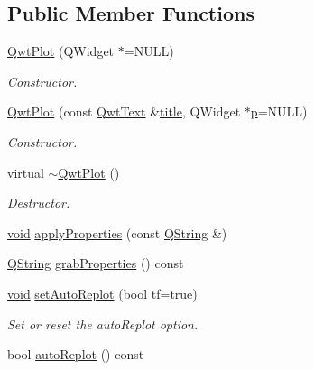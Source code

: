 \subsection*{Public Member Functions}
\begin{DoxyCompactItemize}
\item 
\hyperlink{class_qwt_plot_acde7121614da027e9a1dbc4591613ca7}{Qwt\-Plot} (Q\-Widget $\ast$=N\-U\-L\-L)
\begin{DoxyCompactList}\small\item\em Constructor. \end{DoxyCompactList}\item 
\hyperlink{class_qwt_plot_a12888a2101ba2091db0e4710c6a109cb}{Qwt\-Plot} (const \hyperlink{class_qwt_text}{Qwt\-Text} \&\hyperlink{class_qwt_plot_a1ae4b2e10f6691b7f1a14af70f743e2c}{title}, Q\-Widget $\ast$\hyperlink{glext_8h_aa5367c14d90f462230c2611b81b41d23}{p}=N\-U\-L\-L)
\begin{DoxyCompactList}\small\item\em Constructor. \end{DoxyCompactList}\item 
virtual \hyperlink{class_qwt_plot_a2b60620e3681810946dcc66002aad016}{$\sim$\-Qwt\-Plot} ()
\begin{DoxyCompactList}\small\item\em Destructor. \end{DoxyCompactList}\item 
\hyperlink{group___u_a_v_objects_plugin_ga444cf2ff3f0ecbe028adce838d373f5c}{void} \hyperlink{class_qwt_plot_ae7e93c7112d16cbd299cf3cbc0bf9f9f}{apply\-Properties} (const \hyperlink{group___u_a_v_objects_plugin_gab9d252f49c333c94a72f97ce3105a32d}{Q\-String} \&)
\item 
\hyperlink{group___u_a_v_objects_plugin_gab9d252f49c333c94a72f97ce3105a32d}{Q\-String} \hyperlink{class_qwt_plot_afd1c65720e19e50aa083dabd5bbf88e8}{grab\-Properties} () const 
\item 
\hyperlink{group___u_a_v_objects_plugin_ga444cf2ff3f0ecbe028adce838d373f5c}{void} \hyperlink{class_qwt_plot_a654934ec2ad167101dacb5174f5172d6}{set\-Auto\-Replot} (bool tf=true)
\begin{DoxyCompactList}\small\item\em Set or reset the auto\-Replot option. \end{DoxyCompactList}\item 
bool \hyperlink{class_qwt_plot_af14053ca41be0f9c6f820ed3c4379831}{auto\-Replot} () const 
\item 

\end{DoxyCompactItemize}
